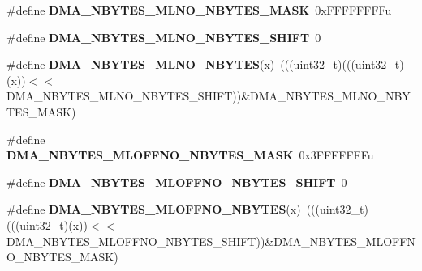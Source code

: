 \begin{DoxyCompactItemize}
\item 
\#define {\bfseries D\+M\+A\+\_\+\+N\+B\+Y\+T\+E\+S\+\_\+\+M\+L\+N\+O\+\_\+\+N\+B\+Y\+T\+E\+S\+\_\+\+M\+A\+SK}~0x\+F\+F\+F\+F\+F\+F\+F\+Fu\hypertarget{group__DMA__Register__Masks_ga5898074fa37efdc15af6621cd8daa450}{}\label{group__DMA__Register__Masks_ga5898074fa37efdc15af6621cd8daa450}

\item 
\#define {\bfseries D\+M\+A\+\_\+\+N\+B\+Y\+T\+E\+S\+\_\+\+M\+L\+N\+O\+\_\+\+N\+B\+Y\+T\+E\+S\+\_\+\+S\+H\+I\+FT}~0\hypertarget{group__DMA__Register__Masks_ga98cb66e15329c07a5b38d3d10c0d3dbe}{}\label{group__DMA__Register__Masks_ga98cb66e15329c07a5b38d3d10c0d3dbe}

\item 
\#define {\bfseries D\+M\+A\+\_\+\+N\+B\+Y\+T\+E\+S\+\_\+\+M\+L\+N\+O\+\_\+\+N\+B\+Y\+T\+ES}(x)~(((uint32\+\_\+t)(((uint32\+\_\+t)(x))$<$$<$D\+M\+A\+\_\+\+N\+B\+Y\+T\+E\+S\+\_\+\+M\+L\+N\+O\+\_\+\+N\+B\+Y\+T\+E\+S\+\_\+\+S\+H\+I\+FT))\&D\+M\+A\+\_\+\+N\+B\+Y\+T\+E\+S\+\_\+\+M\+L\+N\+O\+\_\+\+N\+B\+Y\+T\+E\+S\+\_\+\+M\+A\+SK)\hypertarget{group__DMA__Register__Masks_ga955150e5aaff65cceeb0e2fb0f08d6c6}{}\label{group__DMA__Register__Masks_ga955150e5aaff65cceeb0e2fb0f08d6c6}

\item 
\#define {\bfseries D\+M\+A\+\_\+\+N\+B\+Y\+T\+E\+S\+\_\+\+M\+L\+O\+F\+F\+N\+O\+\_\+\+N\+B\+Y\+T\+E\+S\+\_\+\+M\+A\+SK}~0x3\+F\+F\+F\+F\+F\+F\+Fu\hypertarget{group__DMA__Register__Masks_ga7c3faf561a42d91448404d94823535ff}{}\label{group__DMA__Register__Masks_ga7c3faf561a42d91448404d94823535ff}

\item 
\#define {\bfseries D\+M\+A\+\_\+\+N\+B\+Y\+T\+E\+S\+\_\+\+M\+L\+O\+F\+F\+N\+O\+\_\+\+N\+B\+Y\+T\+E\+S\+\_\+\+S\+H\+I\+FT}~0\hypertarget{group__DMA__Register__Masks_ga0ce6afd8f00fcbe8d7dee4fcefa8ffdf}{}\label{group__DMA__Register__Masks_ga0ce6afd8f00fcbe8d7dee4fcefa8ffdf}

\item 
\#define {\bfseries D\+M\+A\+\_\+\+N\+B\+Y\+T\+E\+S\+\_\+\+M\+L\+O\+F\+F\+N\+O\+\_\+\+N\+B\+Y\+T\+ES}(x)~(((uint32\+\_\+t)(((uint32\+\_\+t)(x))$<$$<$D\+M\+A\+\_\+\+N\+B\+Y\+T\+E\+S\+\_\+\+M\+L\+O\+F\+F\+N\+O\+\_\+\+N\+B\+Y\+T\+E\+S\+\_\+\+S\+H\+I\+FT))\&D\+M\+A\+\_\+\+N\+B\+Y\+T\+E\+S\+\_\+\+M\+L\+O\+F\+F\+N\+O\+\_\+\+N\+B\+Y\+T\+E\+S\+\_\+\+M\+A\+SK)\hypertarget{group__DMA__Register__Masks_ga6ade3a2121a12d70dd34e978f92465e3}{}\label{group__DMA__Register__Masks_ga6ade3a2121a12d70dd34e978f92465e3}


\end{DoxyCompactItemize}
